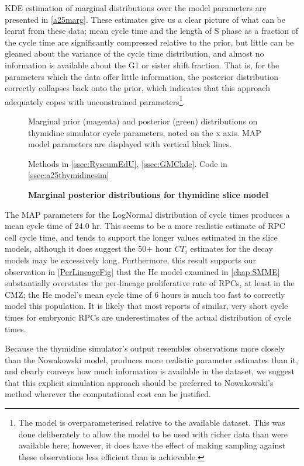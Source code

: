 KDE estimation of marginal distributions over the model parameters are presented in \autoref{a25marg}. These estimates give us a clear picture of what can be learnt from these data; mean cycle time and the length of S phase as a fraction of the cycle time are significantly compressed relative to the prior, but little can be gleaned about the variance of the cycle time distribution, and almost no information is available about the G1 or sister shift fraction. That is, for the parameters which the data offer little information, the posterior distribution correctly collapses back onto the prior, which indicates that this approach adequately copes with unconstrained parameters\footnote{The model is overparameterised relative to the available dataset. This was done deliberately to allow the model to be used with richer data than were available here; however, it does have the effect of making sampling against these observations less efficient than is achievable.}.

\begin{figure}[!h]
    \caption{{\bf Marginal posterior distributions for thymidine slice model}}
    Marginal prior (magenta) and posterior (green) distributions on thymidine simulator cycle parameters, noted on the x axis. MAP model parameters are displayed with vertical black lines.

    Methods in \autoref{ssec:RyscumEdU}, \autoref{ssec:GMCkde}. Code in \autoref{ssec:a25thymidinesim}
    \label{a25marg}
\end{figure}

The MAP parameters for the LogNormal distribution of cycle times produces a mean cycle time of 24.0 hr. This seems to be a more realistic estimate of RPC cell cycle time, and tends to support the longer values estimated in the slice models, although it does suggest the 50+ hour $CT_{i}$ estimates for the decay models may be excessively long. Furthermore, this result supports our observation in \autoref{PerLineageFig} that the He model examined in \autoref{chap:SMME} substantially overstates the per-lineage proliferative rate of RPCs, at least in the CMZ; the He model's mean cycle time of 6 hours is much too fast to correctly model this population. It is likely that most reports of similar, very short cycle times for embryonic RPCs are underestimates of the actual distribution of cycle times.

Because the thymidine simulator's output resembles observations more closely than the Nowakowski model, produces more realistic parameter estimates than it, and clearly conveys how much information is available in the dataset, we suggest that this explicit simulation approach should be preferred to Nowakowski's method wherever the computational cost can be justified. 

